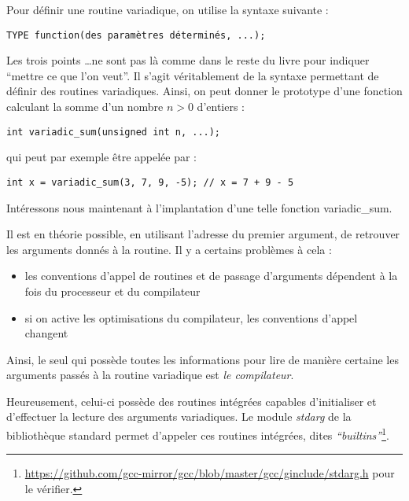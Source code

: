 \documentclass[../../../main.tex]{subfiles}
\begin{document}
Pour définir une routine variadique, on utilise la syntaxe suivante :
\begin{verbatim}
TYPE function(des paramètres déterminés, ...);
\end{verbatim}
Les trois points \dots ne sont pas là comme dans le reste du livre pour indiquer ``mettre ce que l'on veut''. Il s'agit véritablement de la syntaxe permettant de définir des routines variadiques. Ainsi, on peut donner le prototype d'une fonction calculant la somme d'un nombre $n > 0$ d'entiers :
\begin{verbatim}
int variadic_sum(unsigned int n, ...);
\end{verbatim}
qui peut par exemple être appelée par :
\begin{verbatim}
int x = variadic_sum(3, 7, 9, -5); // x = 7 + 9 - 5
\end{verbatim}
Intéressons nous maintenant à l'implantation d'une telle fonction \textsf{variadic\_sum}.

Il est en théorie possible, en utilisant l'adresse du premier argument, de retrouver les arguments donnés à la routine. Il y a certains problèmes à cela :
\begin{itemize}
	\item les conventions d'appel de routines et de passage d'arguments dépendent à la fois du processeur et du compilateur
	\item si on active les optimisations du compilateur, les conventions d'appel changent
\end{itemize} 
Ainsi, le seul qui possède toutes les informations pour lire de manière certaine les arguments passés à la routine variadique est \textit{le compilateur}. 

Heureusement, celui-ci possède des routines intégrées capables d'initialiser et d'effectuer la lecture des arguments variadiques. Le module \textit{stdarg} de la bibliothèque standard permet d'appeler ces routines intégrées, dites \textit{``builtins''}\footnote{\url{https://github.com/gcc-mirror/gcc/blob/master/gcc/ginclude/stdarg.h} pour le vérifier.}.
\end{document}
